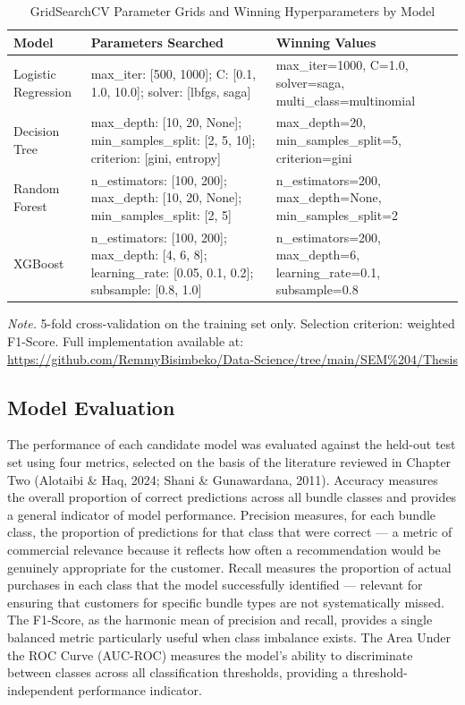\begin{table}[H]
\centering
\caption{GridSearchCV Parameter Grids and Winning Hyperparameters by Model}
\label{tab:hyperparams}
\small
\renewcommand{\arraystretch}{1.3}
\begin{tabularx}{\textwidth}{
  >{\raggedright\arraybackslash}p{2.8cm}
  >{\raggedright\arraybackslash}p{5.2cm}
  >{\raggedright\arraybackslash}X
}
\toprule
\textbf{Model} & \textbf{Parameters Searched} & \textbf{Winning Values} \\
\midrule
Logistic Regression &
max\_iter: [500, 1000]; C: [0.1, 1.0, 10.0]; solver: [lbfgs, saga] &
max\_iter=1000, C=1.0, solver=saga, multi\_class=multinomial \\
\addlinespace[4pt]
Decision Tree &
max\_depth: [10, 20, None]; min\_samples\_split: [2, 5, 10]; criterion: [gini, entropy] &
max\_depth=20, min\_samples\_split=5, criterion=gini \\
\addlinespace[4pt]
Random Forest &
n\_estimators: [100, 200]; max\_depth: [10, 20, None]; min\_samples\_split: [2, 5] &
n\_estimators=200, max\_depth=None, min\_samples\_split=2 \\
\addlinespace[4pt]
XGBoost &
n\_estimators: [100, 200]; max\_depth: [4, 6, 8]; learning\_rate: [0.05, 0.1, 0.2];
subsample: [0.8, 1.0] &
n\_estimators=200, max\_depth=6, learning\_rate=0.1, subsample=0.8 \\
\bottomrule
\end{tabularx}
\begin{flushleft}
\small\textit{Note.} 5-fold cross-validation on the training set only.
Selection criterion: weighted F1-Score. Full implementation available at:
\url{https://github.com/RemmyBisimbeko/Data-Science/tree/main/SEM\%204/Thesis}
\end{flushleft}
\end{table}

\subsection{Model Evaluation}

The performance of each candidate model was evaluated against the held-out test set using four metrics, selected on the basis of the literature reviewed in Chapter Two (Alotaibi \& Haq, 2024; Shani \& Gunawardana, 2011). Accuracy measures the overall proportion of correct predictions across all bundle classes and provides a general indicator of model performance. Precision measures, for each bundle class, the proportion of predictions for that class that were correct --- a metric of commercial relevance because it reflects how often a recommendation would be genuinely appropriate for the customer. Recall measures the proportion of actual purchases in each class that the model successfully identified --- relevant for ensuring that customers for specific bundle types are not systematically missed. The F1-Score, as the harmonic mean of precision and recall, provides a single balanced metric particularly useful when class imbalance exists. The Area Under the ROC Curve (AUC-ROC) measures the model's ability to discriminate between classes across all classification thresholds, providing a threshold-independent performance indicator.

